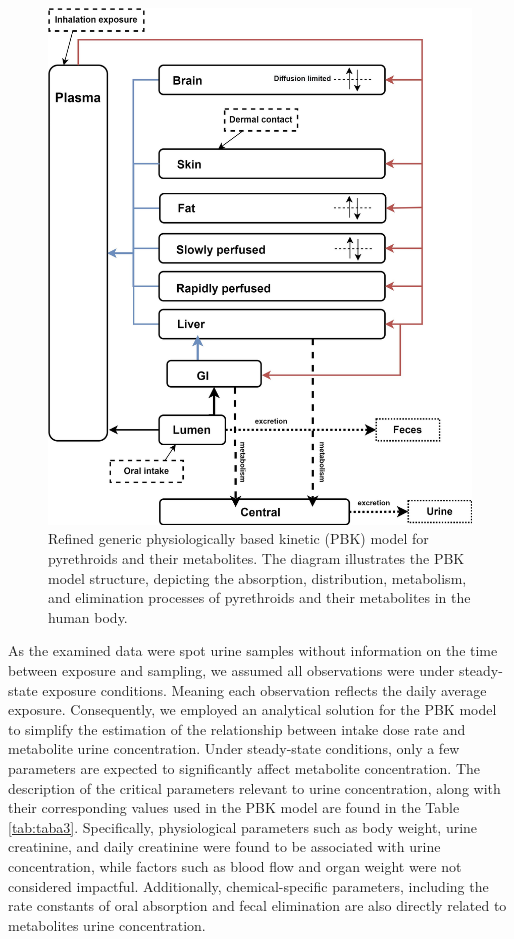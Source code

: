 \documentclass[toxics,article,submit,pdftex,moreauthors]{Definitions/mdpi}
\begin{document}
\begin{figure}[H]
\includegraphics[width=0.8\linewidth,]{figures/fig2} \caption{Refined generic physiologically based kinetic (PBK) model for pyrethroids and their metabolites. The diagram illustrates the PBK model structure, depicting the absorption, distribution, metabolism, and elimination processes of pyrethroids and their metabolites in the human body.}\label{fig:fig2}
\end{figure}

As the examined data were spot urine samples without information on the
time between exposure and sampling, we assumed all observations were
under steady-state exposure conditions. Meaning each observation
reflects the daily average exposure. Consequently, we employed an
analytical solution for the PBK model to simplify the estimation of the
relationship between intake dose rate and metabolite urine
concentration. Under steady-state conditions, only a few parameters are
expected to significantly affect metabolite concentration. The
description of the critical parameters relevant to urine concentration,
along with their corresponding values used in the PBK model are found in
the Table \ref{tab:taba3}. Specifically, physiological parameters such
as body weight, urine creatinine, and daily creatinine were found to be
associated with urine concentration, while factors such as blood flow
and organ weight were not considered impactful. Additionally,
chemical-specific parameters, including the rate constants of oral
absorption and fecal elimination are also directly related to
metabolites urine concentration.
\end{document}
